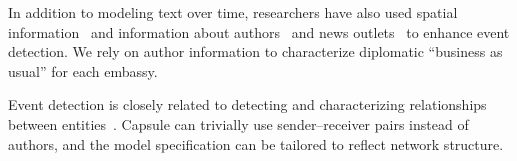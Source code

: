 In addition to modeling text over time, researchers have also used
spatial
information~\cite{Neill:2005,mathioudakis2010identifying,liu2011using}
and information about authors~\cite{zhao2007temporal} and news
outlets~\cite{wang2007mining} to enhance event detection. We rely on
author information to characterize diplomatic ``business as usual''
for each embassy.

Event detection is closely related to detecting and characterizing
relationships between
entities~\cite{schein2015bayesian,linderman2014discovering,das2011dynamic}. Capsule
can trivially use sender--receiver pairs instead of authors, and the
model specification can be tailored to reflect network structure.

